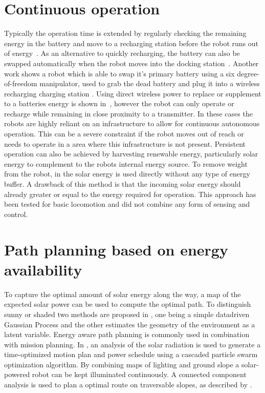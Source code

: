 \section{Continuous operation} 

Typically the operation time is extended by regularly checking the remaining energy in the battery and move to a recharging station before the robot runs out of energy~\cite{pickem_icra_2015, rubenstein_icra_2012}.
As an alternative to quickly recharging, the battery can also be swapped automatically when the robot moves into the docking station~\cite{kemal_mech_2015}.
Another work shows a robot which is able to swap it's primary battery using a six degree-of-freedom manipulator, used to grab the dead battery and plug it into a wireless recharging charging station \cite{zhang_conel_2013}.
Using direct wireless power to replace or supplement to a batteries energy is shown in~\cite{karpelson_icra_2014}, however the robot can only operate or recharge while remaining in close proximity to a transmitter. 
In these cases the robots are highly reliant on an infrastructure to allow for continuous autonomous operation.
This can be a severe constraint if the robot moves out of reach or needs to operate in a area where this infrastructure is not present. Persistent operation can also be achieved by harvesting renewable energy, particularly solar energy to complement to the robots internal energy source. To remove weight from the robot, in \cite{bruhwiler_iros_2015} the solar energy is used directly without any type of energy buffer. A drawback of this method is that the incoming solar energy should already greater or equal to the energy required for operation. This approach has been tested for basic locomotion and did not combine any form of sensing and control.

\section{Path planning based on energy availability}

To capture the optimal amount of solar energy along the way, a map of the expected solar power can be used to compute the optimal path. To distinguish sunny or shaded two methods are proposed in \cite{plonski_tranro_2016}, one being a simple datadriven Gaussian Process and the other estimates the geometry of the environment as a latent variable.
Energy aware path planning is commonly used in combination with mission planning.
In \cite{kaplan_iros_2016}, an analysis of the solar radiation is used to generate a time-optimized motion plan and power schedule using a cascaded particle swarm optimization algorithm.
By combining maps of lighting and ground slope a solar-powered robot can be kept illuminated continuously. A connected component analysis is used to plan a optimal route on traversable slopes, as described by \cite{otten_icra_2015}.



